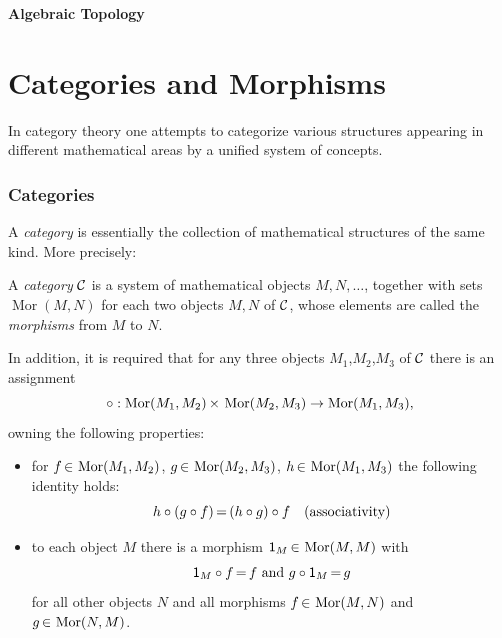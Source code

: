\documentclass[11pt,twoside]{article}
\begin{document}
\thispagestyle{empty}

\def\Title{Algebraic Topology}

\centerline{\large{\textbf{\Title}}}
\vspace{4pt}
\centerline{\small{{\textsc{\Author}}}}
\vspace{10pt}



\fancyhead[C] {\small{\textsc{\Title}}}
\fancyhead[OL]{\small{\thepage}}
\fancyhead[ER]{\small{\thepage}}


\part{Categories and Morphisms}
In category theory one attempts to categorize various structures
appearing in different mathematical areas by a unified system of concepts.

\section{Categories}
A \textit{category} is essentially the collection of mathematical structures
of the same kind.
More precisely:

\begin{definition}
A \textit{category} $\cal{C}$ is a system of mathematical objects $M,N,\ldots$,
together with sets $\operatorname{Mor}(M,N)$
for each two objects $M,N$ of $\cal{C}$, 
whose elements are called the \textit{morphisms} from $M$ to $N$.

In addition, it is required that
for any three objects $M_1$,$M_2$,$M_3$ of $\cal{C}$ there is an assignment
\[
\circ: \cross{\operatorname{Mor}(M_1,M_2)}
             {\operatorname{Mor}(M_2,M_3)}
       \to    \operatorname{Mor}(M_1,M_3),
\]
owning the following properties:

\begin{itemize}[leftmargin=22pt]
\item[1.]
for $f \xeof \operatorname{Mor}(M_1,M_2)$, 
    $g \xeof \operatorname{Mor}(M_2,M_3)$, 
    $h \xeof \operatorname{Mor}(M_1,M_3)$
the following identity holds:
\[
h \circ (g \circ f) \eq (h \circ g) \circ f \quad \mbox{(associativity)}
\]

\item[2.]
to each object $M$ there is a morphism
$\1_M \xeof \operatorname{Mor}(M,M)$ with 
\[
\1_M \circ f \eq f \mbox{ and } g \circ \1_M \eq g 
\]
for all other objects $N$ and 
all morphisms $f \xeof \operatorname{Mor}(M,N)$ and 
              $g \xeof \operatorname{Mor}(N,M)$.
\end{itemize}
\end{definition}
\end{document}
